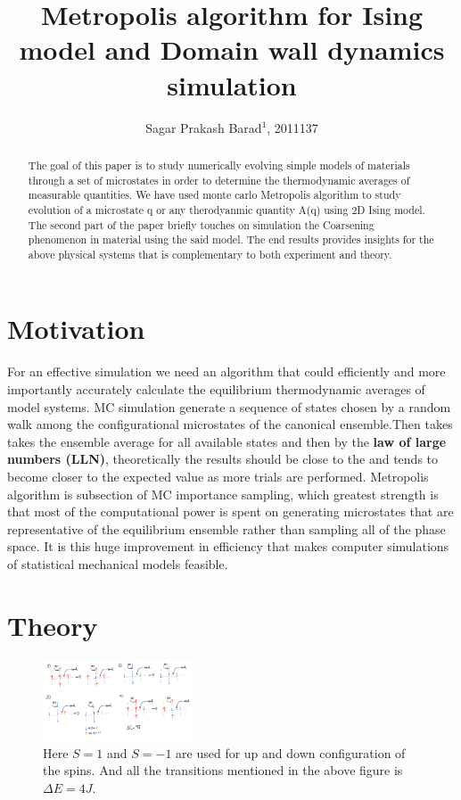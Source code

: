 \documentclass[5p,authoryear]{elsarticle}
\begin{document}
\begin{frontmatter}

\title{\textbf{Metropolis algorithm for Ising model and Domain wall dynamics simulation}}

\author{Sagar Prakash Barad$^1$, 2011137}
\address{$^1$School of Physical Sciences, National Institute of Science Education and Research, HBNI, Jatni-752050, India}


\begin{abstract}
  The goal of this paper is to study numerically evolving simple models of materials through a set of microstates in order to determine the thermodynamic averages of measurable quantities.
  We have used monte carlo Metropolis algorithm to study evolution of a microstate q or any therodyanmic quantity A(q) using 2D Ising model. The second part of the paper briefly touches on simulation the Coarsening phenomenon in material using the said model. The end results provides insights for the above physical systems that is complementary to both experiment and theory.
\end{abstract}
\end{frontmatter}

\section{Motivation}
For an effective simulation we need an algorithm that could efficiently and more importantly accurately calculate the equilibrium thermodynamic averages of model systems. MC simulation
generate a sequence of states chosen by a random walk among the configurational microstates of the canonical ensemble.Then takes takes the ensemble average for all available states and then by the \textbf{law of large numbers (LLN)}, theoretically the results should be close to the  and tends to become closer to the expected value as more trials are performed. Metropolis algorithm is subsection of MC importance sampling, which greatest strength is that most of the computational power is spent on generating microstates that are representative of the equilibrium
ensemble rather than sampling all of the phase space. It is this huge improvement in efficiency that makes computer simulations of statistical mechanical models feasible.

\section{Theory}
\begin{figure}[h]
  \centering
  \includegraphics[width=0.4\textwidth]{2.png}
  \caption{Here $S = 1$ and $S = -1$ are used for up and down configuration of the spins. And all the transitions mentioned in the above figure is $\Delta E = 4J$.}
\end{figure}
\end{document}
